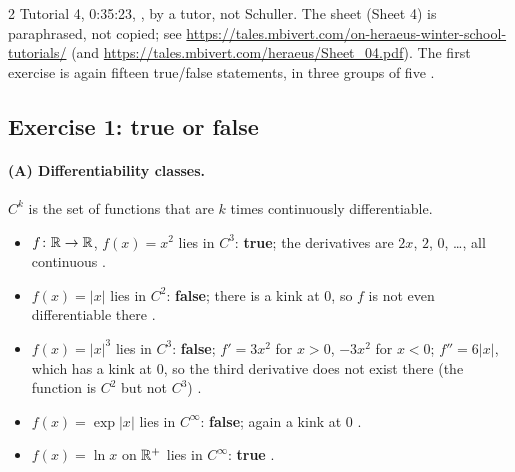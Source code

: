 \begin{paracol}{2}
Tutorial 4, 0:35:23, , by a tutor, not Schuller. The sheet (Sheet 4) is paraphrased, not copied; see \url{https://tales.mbivert.com/on-heraeus-winter-school-tutorials/} (and \url{https://tales.mbivert.com/heraeus/Sheet_04.pdf}).
The first exercise is again fifteen true/false statements, in three groups of five .

\subsection*{Exercise 1: true or false}

\paragraph{(A) Differentiability classes.} $C^k$ is the set of functions that are $k$ times continuously differentiable.
\begin{itemize}
  \item $f\colon\mathbb{R}\to\mathbb{R}$, $f(x)=x^2$ lies in $C^3$: \textbf{true}; the derivatives are $2x$, $2$, $0$, \dots, all continuous .
  \item $f(x)=|x|$ lies in $C^2$: \textbf{false}; there is a kink at $0$, so $f$ is not even differentiable there .
  \item $f(x)=|x|^3$ lies in $C^3$: \textbf{false}; $f'=3x^2$ for $x>0$, $-3x^2$ for $x<0$; $f''=6|x|$, which has a kink at $0$, so the third derivative does not exist there (the function is $C^2$ but not $C^3$) .
  \item $f(x)=\exp|x|$ lies in $C^\infty$: \textbf{false}; again a kink at $0$ .
  \item $f(x)=\ln x$ on $\mathbb{R}^+$ lies in $C^\infty$: \textbf{true} .
\end{itemize}


\end{paracol}
